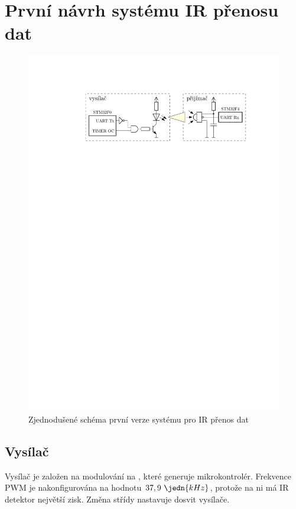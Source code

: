 \section{První návrh systému IR přenosu dat}
\begin{figure}[H]
    \begin{center}
        \includegraphics[width=\textwidth]{img/fake}
    \end{center}
    \caption{Zjednodušené schéma první verze systému pro IR přenos dat}
\end{figure}

\subsection{Vysílač}
Vysílač je založen na modulování  na , které generuje mikrokontrolér. Frekvence PWM je nakonfigurována na hodnotu $37,9~\jedn{kHz}$, protože na ni má IR detektor největší zisk. Změna střídy nastavuje dosvit vysílače.

